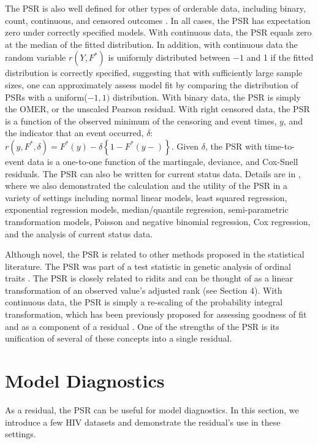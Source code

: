\documentclass[12pt, usenatbib]{article}
\begin{document}
The PSR is also well defined for other types of orderable data, including binary, count, continuous, and censored outcomes \citep{shepherd2016psr}.  In all cases, the PSR has expectation zero under correctly specified models.  With continuous data, the PSR equals zero at the median of the fitted distribution.  In addition, with continuous data the random variable $r(Y,F^*)$ is uniformly distributed between $-1$ and 1 if the fitted distribution is correctly specified, suggesting that with sufficiently large sample sizes, one can approximately assess model fit by comparing the distribution of PSRs with a uniform($-1,1)$ distribution.  With binary data, the PSR is simply the OMER, or the unscaled Pearson residual.  With right censored data, the PSR is a function of the observed minimum of the censoring and event times, $y$, and the indicator that an event occurred, $\delta$:  $r(y,F^*,\delta)=F^*(y)- \delta \left\{1-F^*(y-)\right\}$.  Given $\delta$, the PSR with time-to-event data is a one-to-one function of the martingale, deviance, and Cox-Snell residuals.  The PSR can also be written for current status data.  Details are in \cite{shepherd2016psr}, where we also demonstrated the calculation and the utility of the PSR in a variety of settings including normal linear models, least squared regression, exponential regression models, median/quantile regression, semi-parametric transformation models, Poisson and negative binomial regression, Cox regression, and the analysis of current status data.

Although novel, the PSR is related to other methods proposed in the statistical literature.  The PSR was part of a test statistic in genetic analysis of ordinal traits \citep{zhang2006detection}. The PSR is closely related to ridits \citep{bross1958use} and can be thought of as a linear transformation of an observed value's adjusted rank (see Section 4).  With continuous data, the PSR is simply a re-scaling of the probability integral transformation, which has been previously proposed for assessing goodness of fit \citep{pearson1938, davidjohnson1948} and as a component of a residual \citep{coxsnell1968, davisontsai1992, dunnsmyth1996}.  One of the strengths of the PSR is its unification of several of these concepts into a single residual.


\section{Model Diagnostics}

As a residual, the PSR can be useful for model diagnostics.  In this section, we introduce a few HIV datasets and demonstrate the residual's use in these settings.  
\end{document}
